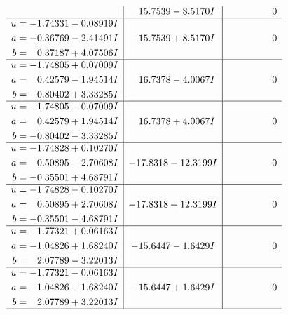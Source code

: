 \documentclass[1p]{elsarticle_modified}
\theoremstyle{definition}
\begin{document}
$$\begin{array}{c|c|c}
 & \phantom{-}15.7539 - 8.5170 I & \phantom{-0.000000 } 0 \\ \hline\begin{aligned}
u &= -1.74331 - 0.08919 I \\
a &= -0.36769 - 2.41491 I \\
b &= \phantom{-}0.37187 + 4.07506 I\end{aligned}
 & \phantom{-}15.7539 + 8.5170 I & \phantom{-0.000000 } 0 \\ \hline\begin{aligned}
u &= -1.74805 + 0.07009 I \\
a &= \phantom{-}0.42579 - 1.94514 I \\
b &= -0.80402 + 3.33285 I\end{aligned}
 & \phantom{-}16.7378 - 4.0067 I & \phantom{-0.000000 } 0 \\ \hline\begin{aligned}
u &= -1.74805 - 0.07009 I \\
a &= \phantom{-}0.42579 + 1.94514 I \\
b &= -0.80402 - 3.33285 I\end{aligned}
 & \phantom{-}16.7378 + 4.0067 I & \phantom{-0.000000 } 0 \\ \hline\begin{aligned}
u &= -1.74828 + 0.10270 I \\
a &= \phantom{-}0.50895 - 2.70608 I \\
b &= -0.35501 + 4.68791 I\end{aligned}
 & -17.8318 - 12.3199 I & \phantom{-0.000000 } 0 \\ \hline\begin{aligned}
u &= -1.74828 - 0.10270 I \\
a &= \phantom{-}0.50895 + 2.70608 I \\
b &= -0.35501 - 4.68791 I\end{aligned}
 & -17.8318 + 12.3199 I & \phantom{-0.000000 } 0 \\ \hline\begin{aligned}
u &= -1.77321 + 0.06163 I \\
a &= -1.04826 + 1.68240 I \\
b &= \phantom{-}2.07789 - 3.22013 I\end{aligned}
 & -15.6447 - 1.6429 I & \phantom{-0.000000 } 0 \\ \hline\begin{aligned}
u &= -1.77321 - 0.06163 I \\
a &= -1.04826 - 1.68240 I \\
b &= \phantom{-}2.07789 + 3.22013 I\end{aligned}
 & -15.6447 + 1.6429 I & \phantom{-0.000000 } 0\\
 \hline 
 \end{array}$$\newpage\newpage\renewcommand{\arraystretch}{1}
\end{document}
